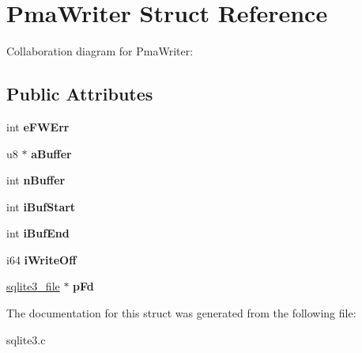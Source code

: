 \hypertarget{structPmaWriter}{}\section{Pma\+Writer Struct Reference}
\label{structPmaWriter}


Collaboration diagram for Pma\+Writer\+:
\subsection*{Public Attributes}
\begin{DoxyCompactItemize}
\item 
int {\bfseries e\+F\+W\+Err}\hypertarget{structPmaWriter_a3d74aff37c8abafd22ec8f8159d08725}{}\label{structPmaWriter_a3d74aff37c8abafd22ec8f8159d08725}

\item 
u8 $\ast$ {\bfseries a\+Buffer}\hypertarget{structPmaWriter_ae53ada27501eb89a45409db4776f3b23}{}\label{structPmaWriter_ae53ada27501eb89a45409db4776f3b23}

\item 
int {\bfseries n\+Buffer}\hypertarget{structPmaWriter_a5d8e651696b33ff6318e7d8473ee9e1b}{}\label{structPmaWriter_a5d8e651696b33ff6318e7d8473ee9e1b}

\item 
int {\bfseries i\+Buf\+Start}\hypertarget{structPmaWriter_ae77a80d66a5f3d40cd5d57861a455281}{}\label{structPmaWriter_ae77a80d66a5f3d40cd5d57861a455281}

\item 
int {\bfseries i\+Buf\+End}\hypertarget{structPmaWriter_ab15d816e53fb4496dd1e59094d4839a6}{}\label{structPmaWriter_ab15d816e53fb4496dd1e59094d4839a6}

\item 
i64 {\bfseries i\+Write\+Off}\hypertarget{structPmaWriter_ad45a9271cbcdd0e506b81b77d2a744a5}{}\label{structPmaWriter_ad45a9271cbcdd0e506b81b77d2a744a5}

\item 
\hyperlink{structsqlite3__file}{sqlite3\+\_\+file} $\ast$ {\bfseries p\+Fd}\hypertarget{structPmaWriter_a54606c98fb9e7318a55ed59de0e55550}{}\label{structPmaWriter_a54606c98fb9e7318a55ed59de0e55550}

\end{DoxyCompactItemize}


The documentation for this struct was generated from the following file\+:\begin{DoxyCompactItemize}
\item 
sqlite3.\+c\end{DoxyCompactItemize}
